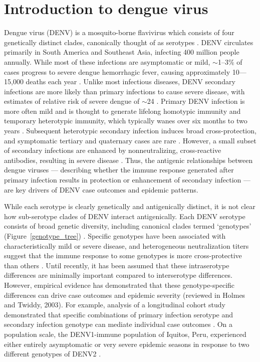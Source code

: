\section{Introduction to dengue virus}
Dengue virus (DENV) is a mosquito-borne flavivirus which consists of four genetically distinct clades, canonically thought of as serotypes \citep{lanciotti1997molecular}.
DENV circulates primarily in South America and Southeast Asia, infecting 400 million people annually.
While most of these infections are asymptomatic or mild, $\sim$1--3\% of cases progress to severe dengue hemorrhagic fever, causing approximately 10---15,000 deaths each year \citep{bhatt2013global}.
Unlike most infectious diseases, DENV secondary infections are more likely than primary infections to cause severe disease, with estimates of relative risk of severe dengue of $\sim$24 \citep{mizumoto2014risk}.
Primary DENV infection is more often mild and is thought to generate lifelong homotypic immunity and temporary heterotypic immunity, which typically wanes over six months to two years \citep{katzelnick2016neutralizing,sabin1952research}.
Subsequent heterotypic secondary infection induces broad cross-protection, and symptomatic tertiary and quaternary cases are rare  \citep{gibbons2007analysis,olkowski2013reduced}.
However, a small subset of secondary infections are enhanced by nonneutralizing, cross-reactive antibodies, resulting in severe disease \citep{halstead1979vivo,katzelnick2017antibody,sangkawibha1984risk}.
Thus, the antigenic relationships between dengue viruses --- describing whether the immune response generated after primary infection results in protection or enhancement of secondary infection --- are key drivers of DENV case outcomes and epidemic patterns.

While each serotype is clearly genetically and antigenically distinct, it is not clear how sub-serotype clades of DENV interact antigenically.
Each DENV serotype consists of broad genetic diversity, including canonical clades termed `genotypes' (Figure~\ref{genotype_tree}) \citep{rico1990molecular,twiddy2003inferring}.
Specific genotypes have been associated with characteristically mild or severe disease, and heterogeneous neutralization titers suggest that the immune response to some genotypes is more cross-protective than others \citep{gentry1982identification,russell1967dengue}.
Until recently, it has been assumed that these intraserotype differences are minimally important compared to interserotype differences.
However, empirical evidence has demonstrated that these genotype-specific differences can drive case outcomes and epidemic severity (reviewed in Holmes and Twiddy, 2003).
For example, analysis of a longitudinal cohort study demonstrated that specific combinations of primary infection serotype and secondary infection genotype can mediate individual case outcomes \citep{ohainle2011dynamics}.
On a population scale, the DENV1-immune population of Iquitos, Peru, experienced either entirely asymptomatic or very severe epidemic seasons in response to two different genotypes of DENV2 \citep{kochel2002effect}.

